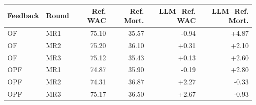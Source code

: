 \begin{tabular}{llrrrr}
    \toprule
    Feedback & Round & Ref. WAC & Ref. Mort. & LLM$-$Ref. WAC & LLM$-$Ref. Mort. \\
    \midrule
    OF & MR1 & 75.10 & 35.57 & -0.94 & +4.87 \\
    OF & MR2 & 75.20 & 36.10 & +0.31 & +2.10 \\
    OF & MR3 & 75.12 & 35.43 & +0.13 & +2.60 \\
    OPF & MR1 & 74.87 & 35.90 & -0.19 & +2.80 \\
    OPF & MR2 & 74.31 & 36.87 & +2.27 & -0.33 \\
    OPF & MR3 & 75.17 & 36.50 & +2.67 & -0.93 \\
    \bottomrule
\end{tabular}
